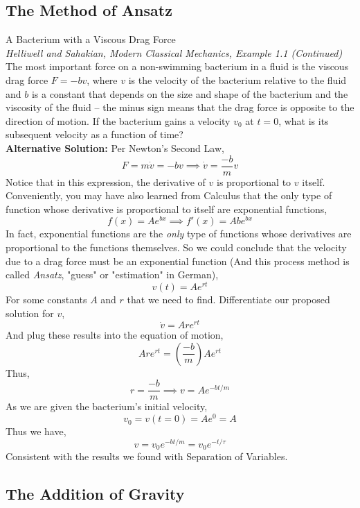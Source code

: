 \documentclass[11pt]{article}
\theoremstyle{gangnamstyle}{\newtheorem{definition}{Definition}[]}
\theoremstyle{gangnamstyle}{\newtheorem{example}{Example}[]}
\theoremstyle{gangnamstyle}{\newtheorem{problem}{Problem}[]}
\theoremstyle{gangnamstyle}{\newtheorem{warning}{Warning}[]}
\begin{document}
\subsection{The Method of Ansatz}

\begin{example}
A Bacterium with a Viscous Drag Force \\
\textit{Helliwell and Sahakian, Modern Classical Mechanics, Example 1.1 (Continued)} \\
The most important force on a non-swimming bacterium in a fluid is the viscous drag force $F = -bv$, where $v$ is the velocity of the bacterium relative to the fluid and $b$ is a constant that depends on the size and shape of the bacterium and the viscosity of the fluid – the minus sign means that the drag force is opposite to the direction of motion. If the bacterium gains a velocity $v_0$ at $t = 0$, what is its subsequent velocity as a function of time? \\

\textbf{Alternative Solution:} Per Newton's Second Law, 
\[ F = m\Dot{v} = -bv \implies \Dot{v} = \frac{-b}{m}v \]
Notice that in this expression, the derivative of $v$ is proportional to $v$ itself. Conveniently, you may have also learned from Calculus that the only type of function whose derivative is proportional to itself are exponential functions, 
\[ f(x) = Ae^{bx} \implies f'(x) = Abe^{bx} \]
In fact, exponential functions are the \textit{only} type of functions whose derivatives are proportional to the functions themselves. So we could conclude that the velocity due to a drag force must be an exponential function (And this process method is called \textit{Ansatz}, "guess" or "estimation" in German), 
\[ v(t) = Ae^{rt} \]
For some constants $A$ and $r$ that we need to find. Differentiate our proposed solution for $v$, 
\[ \Dot{v} = Are^{rt} \]
And plug these results into the equation of motion, 
\[ Are^{rt} = (\frac{-b}{m})Ae^{rt} \]
Thus, 
\[ r = \frac{-b}{m} \implies v = Ae^{-bt/m} \]
As we are given the bacterium's initial velocity, 
\[ v_0 = v(t = 0) = Ae^0 = A \]
Thus we have, 
\[ v = v_0e^{-bt/m} = v_0e^{-t / \tau} \]
Consistent with the results we found with Separation of Variables. 
\end{example}

\subsection{The Addition of Gravity}
\end{document}
